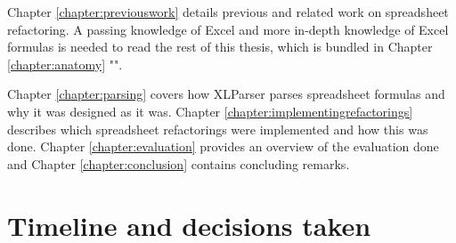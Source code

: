 Chapter \ref{chapter:previouswork} details previous and related work on spreadsheet refactoring.
A passing knowledge of Excel and more in-depth knowledge of Excel formulas is needed to read the rest of this thesis, which is bundled in Chapter \ref{chapter:anatomy} "".

Chapter \ref{chapter:parsing} covers how XLParser parses spreadsheet formulas and why it was designed as it was.
Chapter \ref{chapter:implementingrefactorings} describes which spreadsheet refactorings were implemented and how this was done.
Chapter \ref{chapter:evaluation} provides an overview of the evaluation done and Chapter \ref{chapter:conclusion} contains concluding remarks.

\newpage

\section{Timeline and decisions taken}

